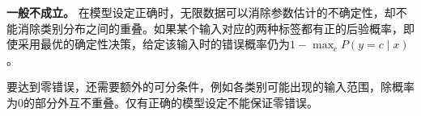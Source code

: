 \textbf{一般不成立。} 在模型设定正确时，无限数据可以消除参数估计的不确定性，却不能消除类别分布之间的重叠。如果某个输入对应的两种标签都有正的后验概率，即使采用最优的确定性决策，给定该输入时的错误概率仍为\(1-\max_c P(y=c\mid x)\)。


要达到零错误，还需要额外的可分条件，例如各类别可能出现的输入范围，除概率为0的部分外互不重叠。仅有正确的模型设定不能保证零错误。
